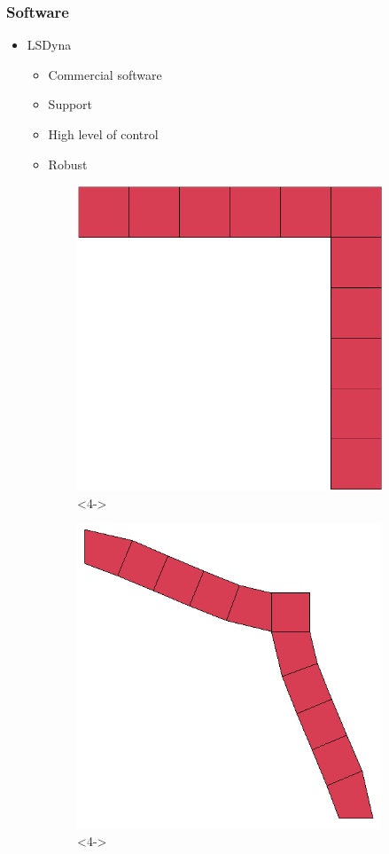 \documentclass[serif, pdf]{beamer}
\begin{document}

\begin{frame}
    \frametitle{Software}
    \begin{itemize}
        \item<1-> LSDyna
        \changefontsizes{11pt}
        \begin{itemize}
            \item<2-> Commercial software
            \item<2-> Support
            \item<3-> High level of control
            \item<3-> Robust
        \end{itemize}
    \end{itemize}
    \begin{figure}[ht!]
        \captionsetup{skip=0.333\baselineskip}
        \centering
        \begin{subfigure}{.49\textwidth}
            \centering
            \includegraphics[width=0.48\linewidth]{Unit_Cell_Corner_Cropped.png}<4->
        \end{subfigure}
        \begin{subfigure}{.49\textwidth}
            \centering
            \includegraphics[width=0.48\linewidth]{Unit_Cell_Corner_Deformed.png}<4->
        \end{subfigure}
    \end{figure}
\end{frame}
\end{document}
